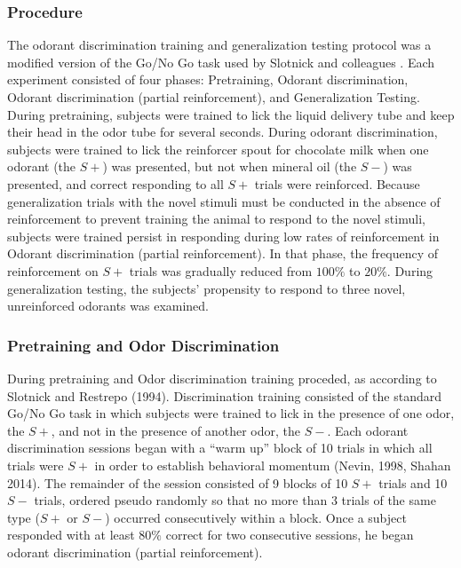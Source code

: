 \subsubsection*{Procedure}
\label{sec:methods_procedure}
The odorant discrimination training and generalization testing protocol was a modified version of the Go/No Go task used by Slotnick and colleagues \cite{18428626}. Each experiment consisted of four phases: Pretraining, Odorant discrimination, Odorant discrimination (partial reinforcement), and Generalization Testing. During pretraining, subjects were trained to lick the liquid delivery tube and keep their head in the odor tube for several seconds. During odorant discrimination, subjects were trained to lick the reinforcer spout for chocolate milk when one odorant (the $S+$) was presented, but not when mineral oil (the $S-$) was presented, and correct responding to all $S+$ trials were reinforced. Because generalization trials with the novel stimuli must be conducted in the absence of reinforcement to prevent training the animal to respond to the novel stimuli, subjects were trained persist in responding during low rates of reinforcement in Odorant discrimination (partial reinforcement). In that phase, the frequency of reinforcement on $S+$ trials was gradually reduced from $100\%$ to $20\%$. During generalization testing, the subjects' propensity to respond to three novel, unreinforced odorants was examined.

\subsubsection*{Pretraining and Odor Discrimination}
\label{sec:methods_pretraining}
During pretraining and Odor discrimination training proceded, as according to Slotnick and Restrepo (1994). Discrimination training consisted of the standard Go/No Go task in which subjects were trained to lick in the presence of one odor, the $S+$, and not in the presence of another odor, the $S-$.  Each odorant discrimination sessions began with a ``warm up'' block of 10 trials in which all trials were $S+$ in order to establish behavioral momentum (Nevin, 1998, Shahan 2014).  The remainder of the session consisted of 9 blocks of 10 $S+$ trials and 10 $S-$ trials, ordered pseudo randomly so that no more than 3 trials of the same type ($S+$ or $S-$) occurred consecutively within a block. Once a subject responded with at least $80\%$ correct for two consecutive sessions, he began odorant discrimination (partial reinforcement).


